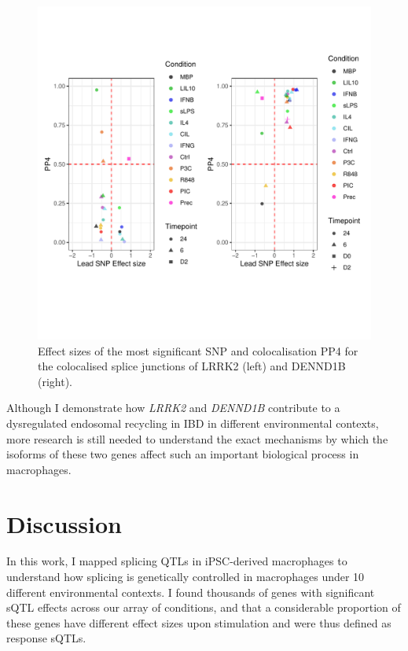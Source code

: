 \begin{figure}[H]
  \centering
  \includegraphics[width=1.0\textwidth]{lrrk2_dennd1b}
  \vspace{-70pt}
  \caption[Effect sizes and $PP_{4}$ values for \textit{LRRK2} and \textit{DENND1B}]{Effect sizes of the most significant SNP and colocalisation PP4 for the colocalised splice junctions of LRRK2 (left) and DENND1B (right).}
  \label{fig:lrrk2_dennd1b}   
\end{figure}

Although I demonstrate how \textit{LRRK2} and \textit{DENND1B} contribute to a dysregulated endosomal recycling in IBD in different environmental contexts, more research is still needed to understand the exact mechanisms by which the isoforms of these two genes affect such an important biological process in macrophages. \\
\newpage
\section{Discussion}

In this work, I mapped splicing QTLs in iPSC-derived macrophages to understand how splicing is genetically controlled in macrophages under 10 different environmental contexts. I found thousands of genes with significant sQTL effects across our array of conditions, and that a considerable proportion of these genes have different effect sizes upon stimulation and were thus defined as response sQTLs.\\

